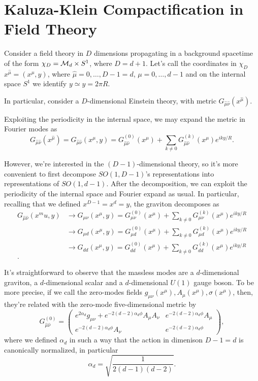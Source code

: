 \section{Kaluza-Klein Compactification in Field Theory}
Consider a field theory in $D$ dimensions propagating in a background spacetime of the form $\chi_D = \mathcal{M}_d \times S^1$, where $D = d+1$. Let's call the coordinates in $\chi_D$ $x^{\hat{\mu}} = (x^\mu, y)$, where $\hat{\mu} = 0, \dots, D-1 = d$, $\mu = 0, \dots, d-1$ and on the internal space $S^1$ we identify $y \simeq y = 2\pi R$.

In particular, consider a $D$-dimensional Einstein theory, with metric $G_{\hat{\mu} \hat{\nu}} (x^{\hat{\mu}})$.

Exploiting the periodicity in the internal space, we may expand the metric in Fourier modes as
\begin{equation}
    G_{\hat{\mu} \hat{\nu}} (x^{\hat{\mu}}) = G_{\hat{\mu} \hat{\nu}} (x^\mu, y) = G^{(0)}_{\hat{\mu} \hat{\nu}} (x^\mu)+ \sum_{k \neq 0} G^{(k)}_{\hat{\mu} \hat{\nu}} (x^\mu) e^{ik y / R}.
\end{equation}

However, we're interested in the $(D-1)$-dimensional theory, so it's more convenient to first decompose $SO(1,D-1)$'s representations into representations of $SO(1,d-1)$. After the decomposition, we can exploit the periodicity of the internal space and Fourier expand as usual. In particular, recalling that we defined $x^{D-1} = x^d = y$, the graviton decomposes as
\begin{align}
    G_{\hat{\mu}\hat{\nu}} (x^mu, y) 
    &\to G_{\mu\nu}(x^\mu, y) = G^{(0)}_{{\mu} {\nu}} (x^\mu)+ \sum_{k \neq 0} G^{(k)}_{{\mu} {\nu}} (x^\mu) e^{ik y / R} \\
    &\to G_{\mu d} (x^\mu, y) = G^{(0)}_{{\mu} {d}} (x^\mu)+ \sum_{k \neq 0} G^{(k)}_{{\mu} {d}} (x^\mu) e^{ik y / R} \\
    &\to G_{dd} (x^\mu, y) = G^{(0)}_{{d} {d}} (x^\mu)+ \sum_{k \neq 0} G^{(k)}_{{d} {d}} (x^\mu) e^{ik y / R} \\.
\end{align}

It's straightforward to observe that the massless modes are a $d$-dimensional graviton, a $d$-dimensional scalar and a $d$-dimensional $U(1)$ gauge boson. To be more precise, if we call the zero-modes fields $g_{\mu\nu}(x^\mu), A_\mu(x^\mu), \sigma(x^\mu)$, then, they're related with the zero-mode five-dimensional metric by
\begin{equation}
    G^{(0)}_{\hat{\mu}\hat{\nu}} = 
    \begin{pmatrix}
        e^{2\alpha_d} g_{\mu\nu} + e^{-2(d-2)\alpha_d \phi} A_\mu A_\nu & e^{-2(d-2)\alpha_d \phi} A_\mu \\
        e^{-2(d-2)\alpha_d \phi} A_\nu & e^{-2(d-2)\alpha_d \phi}
    \end{pmatrix} ,
\end{equation}
where we defined $\alpha_d$ in such a way that the action in dimenison $D-1 = d$ is canonically normalized, in particular
\begin{equation}
    \alpha_d = \sqrt{\frac{1}{2(d-1)(d-2)}} .
\end{equation}

